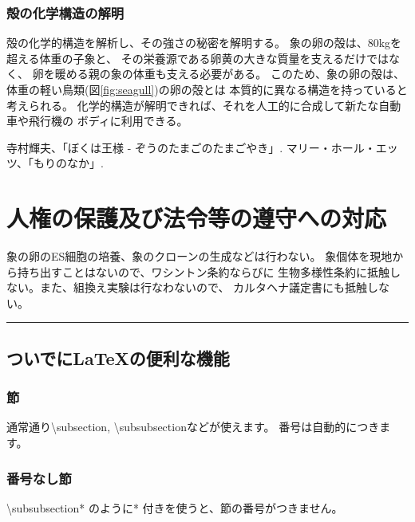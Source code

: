 \documentclass[11pt,a4j,dvipdfmx]{jarticle} 					%
\newcommand{\研究課題名}{象の卵}
\newcommand{\研究機関名}{逢坂大学}
\newcommand{\研究代表者氏名}{湯川秀樹}
\begin{document}
\subsubsection{殻の化学構造の解明}
	殻の化学的構造を解析し、その強さの秘密を解明する。
	象の卵の殻は、80kgを超える体重の子象と、
	その栄養源である卵黄の大きな質量を支えるだけではなく、
	卵を暖める親の象の体重も支える必要がある。
	このため、象の卵の殻は、体重の軽い鳥類(図\ref{fig:seagull})の卵の殻とは
	本質的に異なる構造を持っていると考えられる。
	化学的構造が解明できれば、それを人工的に合成して新たな自動車や飛行機の
	ボディに利用できる。

\vspace*{1zw}
\begin{thebibliography}{99}
	 寺村輝夫、「ぼくは王様 - ぞうのたまごのたまごやき」.
	 マリー・ホール・エッツ、「もりのなか」.
\end{thebibliography}



\section{人権の保護及び法令等の遵守への対応}

	象の卵のES細胞の培養、象のクローンの生成などは行わない。
	象個体を現地から持ち出すことはないので、ワシントン条約ならびに
        生物多様性条約に抵触しない。また、組換え実験は行なわないので、
        カルタヘナ議定書にも抵触しない。

        \noindent
        \rule{\linewidth}{1pt}
        \linenumbers
        \subsection{ついでに\LaTeX の便利な機能}
        \subsubsection{節}
        通常通り\textbackslash subsection, \textbackslash subsubsectionなどが使えます。
        番号は自動的につきます。
        
        \subsubsection*{番号なし節}
        \textbackslash subsubsection* のように* 付きを使うと、節の番号がつきません。
        
\end{document}
